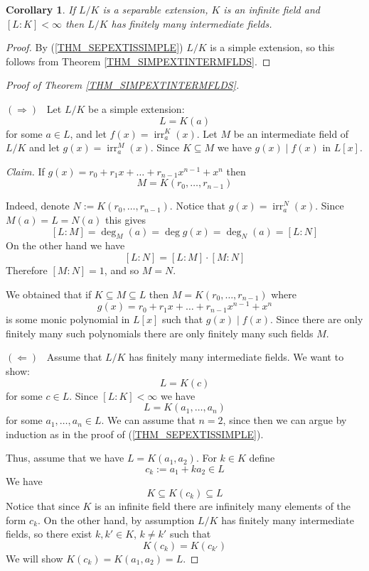 \documentclass[12pt, letterpaper, oneside]{article}
\theoremstyle{plain}
\newtheorem{corollary}[theorem]{Corollary}
\theoremstyle{definition}
\newcommand{\irr}{\operatorname{irr}}
\newcommand{\vs}{\vskip 5mm}
\begin{document}
\vs\vs

\begin{corollary}
\label{COR_SEPEXTINTERMFLDS}
If $L/K$ is a separable extension, $K$ is an infinite field and $[L:K]< \infty$ then 
$L/K$ has finitely many intermediate fields. 
\end{corollary}


\vs

\begin{proof}
By (\ref{THM_SEPEXTISSIMPLE}) $L/K$ is a simple extension, so this 
follows from Theorem  \ref{THM_SIMPEXTINTERMFLDS}. 

\end{proof}


\vs\vs


\begin{proof}[Proof of Theorem \ref{THM_SIMPEXTINTERMFLDS}]\ 


$(\Rightarrow)$ \ Let $L/K$ be a simple extension:
$$L= K(a)$$
for some $a\in L$, and let $f(x) = \irr^{K}_{a}(x)$. Let $M$ be an intermediate field of
$L/K$ and let $g(x) = \irr^{M}_{a}(x)$. Since $K\subseteq M$ we have $g(x)\mid f(x)$ 
in $L[x]$. 

\emph{Claim.} If $g(x) = r_{0}+ r_{1}x + \dots + r_{n-1}x^{n-1} + x^{n}$ then 
$$M = K(r_{0}, \dots, r_{n-1})$$

Indeed, denote $N:= K(r_{0}, \dots, r_{n-1})$. Notice that $g(x) = \irr^{N}_{a}(x)$. 
Since $M(a) = L = N(a)$ this gives 
$$[L:M] = \deg_{M}(a) = \deg g(x) = \deg_{N}(a) = [L:N]$$
On the other hand we have 
$$[L:N] = [L:M]\cdot [M:N]$$ 
Therefore  $[M:N] = 1$, and so $M= N$. 

\vs

We obtained that if $K\subseteq M \subseteq L$ then $M = K(r_{0}, \dots, r_{n-1})$
where 
$$g(x) = r_{0} + r_{1}x + \dots  +  r_{n-1}x^{n-1} + x^{n}$$
is some monic polynomial in $L[x]$ such that $g(x)\mid f(x)$. Since there are only 
finitely many such polynomials there are only finitely many such fields $M$.

\vs

$(\Leftarrow)$ \ Assume that $L/K$ has finitely many intermediate fields. We want to show:
$$L= K(c)$$
for some $c\in L$. Since $[L:K] < \infty$ we have 
$$L= K(a_{1}, \dots, a_{n})$$
for some $a_{1}, \dots, a_{n}\in L$. We can assume  that $n=2$, since then we can 
argue by induction as in the proof of  (\ref{THM_SEPEXTISSIMPLE}). 

Thus, assume that we have $L= K(a_{1}, a_{2})$. For $k\in K$ define
$$c_{k}:= a_{1}+ka_{2}\in L$$
We have 
$$K\subseteq K(c_{k})\subseteq L$$
Notice that  since $K$ is an infinite field there are infinitely many elements of 
the form $c_{k}$.  On the other hand, by assumption $L/K$ has finitely many intermediate fields,
so there exist $k, k'\in K$, $k\neq k'$ such that 
$$K(c_{k})  = K(c_{k'})$$ 
We will show $K(c_{k}) = K(a_{1}, a_{2})  = L$.


\end{proof}
\end{document}
